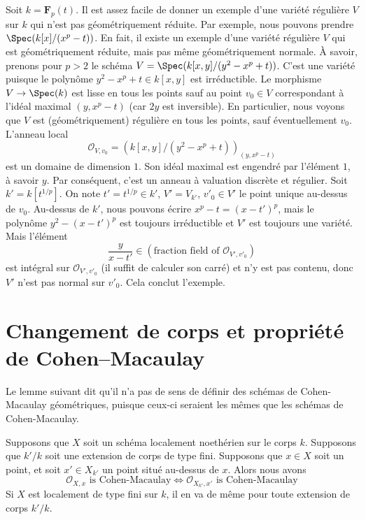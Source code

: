 \begin{example}
\label{example-geometrically-reduced-not-normal}
Soit $k =\mathbf{F}_p(t)$. Il est assez facile de donner un
exemple d'une variété régulière $V$ sur $k$ qui n'est pas
géométriquement réduite. Par exemple, nous pouvons prendre
$\Spec(k[x]/(x^p - t))$. En fait, il existe un exemple d'une
variété régulière $V$ qui est géométriquement réduite, mais pas même
géométriquement normale. À savoir, prenons pour $p > 2$ le schéma $V
= \Spec(k[x, y]/(y^2 - x^p + t))$. C'est une variété puisque le
polynôme $y^2 - x^p + t \in k[x, y]$ est irréductible. Le morphisme
$V \to \Spec(k)$ est lisse en tous les points sauf au point $v_0 \in
V$ correspondant à l'idéal maximal $(y, x^p - t)$ (car $2y$ est
inversible). En particulier, nous voyons que $V$ est (géométriquement)
régulière en tous les points, sauf éventuellement $v_0$. L'anneau local
$$
\mathcal{O}_{V, v_0} = \left(k[x, y]/(y^2 - x^p + t)\right)_{(y, x^p - t)}
$$
est un domaine de dimension $1$. Son idéal maximal est engendré
par l'élément $1$, à savoir $y$. Par conséquent, c'est un anneau
à valuation discrète et régulier. Soit $k' = k[t^{1/p}]$. On note
$t' = t^{1/p} \in k'$, $V' = V_{k'}$, $v'_0 \in V'$ le point
unique au-dessus de $v_0$. Au-dessus de $k'$, nous pouvons écrire
$x^p - t = (x - t')^p$, mais le polynôme $y^2 - (x - t')^p$ est
toujours irréductible et $V'$ est toujours une variété. Mais l'élément
$$
\frac{y}{x - t'} \in (\text{fraction field of }\mathcal{O}_{V', v'_0})
$$
est intégral sur $\mathcal{O}_{V', v'_0}$ (il suffit
de calculer son carré) et n'y est pas contenu, donc
$V'$ n'est pas normal sur $v'_0$. Cela conclut l'exemple.
\end{example}







\section{Changement de corps et propriété de Cohen--Macaulay}
\label{section-CM}

\noindent
Le lemme suivant dit qu'il n'a pas de sens de définir
des schémas de Cohen-Macaulay géométriques, puisque
ceux-ci seraient les mêmes que les schémas de Cohen-Macaulay.

\begin{lemma}
\label{lemma-CM-base-change}
Supposons que $X$ soit un schéma localement noethérien sur le
corps $k$. Supposons que $k'/k$ soit une extension de corps de
type fini. Supposons que $x \in X$ soit un point, et soit $x'
\in X_{k'}$ un point situé au-dessus de $x$. Alors nous avons
$$
\mathcal{O}_{X, x}\text{ is Cohen-Macaulay}
\Leftrightarrow
\mathcal{O}_{X_{k'}, x'}\text{ is Cohen-Macaulay}
$$
Si $X$ est localement de type fini sur $k$, il en
va de même pour toute extension de corps $k'/k$.
\end{lemma}

